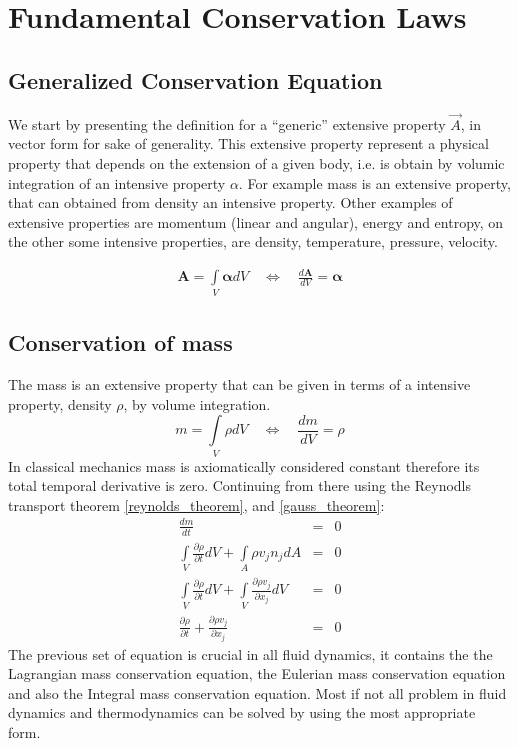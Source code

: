 
\chapter{Fundamental Conservation Laws}
\label{fundamentals}
\section{Generalized Conservation Equation}
We start by presenting the definition for a ``generic'' extensive property $\vec{A}$, in vector form for sake of generality. This extensive property represent a physical property that depends on the extension of a given body, i.e. is obtain by volumic integration of an intensive property $\alpha$. For example mass is an extensive property, that can obtained from density an intensive property. Other examples of extensive properties are momentum (linear and angular), energy and entropy, on the other some intensive properties, are density, temperature, pressure, velocity.
\begin{defi} 
\begin{align}
  \boldsymbol{A}=\int\limits_V \boldsymbol\alpha dV \quad  \Leftrightarrow \quad  \frac{d\boldsymbol A}{dV}=\boldsymbol \alpha
\end{align}
\end{defi}

\newpage

\section{Conservation of mass}
The mass is an extensive property that can be given in terms of a intensive property, density $\rho$, by volume integration.
\begin{equation}
m=\int\limits_V\rho dV  \quad  \Leftrightarrow \quad  \frac{dm}{dV}= \rho
\end{equation}
In classical mechanics mass is axiomatically considered constant therefore its total temporal derivative is zero. Continuing from there using the Reynodls transport theorem \eqref{reynolds_theorem}, and \eqref{gauss_theorem}: 
\begin{eqnarray}
    \frac{dm}{dt} &=& 0\\
    \int\limits_V\frac{\partial \rho}{\partial t} dV +  \int\limits_A \rho v_j n_j dA &=& 0 \\ 
    \int\limits_V\frac{\partial \rho}{\partial t} dV +  \int\limits_V \frac{\partial \rho v_j}{\partial x_j} dV  &=& 0 \\ 
    \frac{\partial \rho}{\partial t} +  \frac{\partial \rho v_j}{\partial x_j} &=& 0 
\end{eqnarray}
The previous set of equation is crucial in all fluid dynamics, it contains the the Lagrangian mass conservation equation, the Eulerian mass conservation equation and also the Integral mass conservation equation. Most if not all problem in fluid dynamics and thermodynamics can be solved by using the most appropriate form.  

